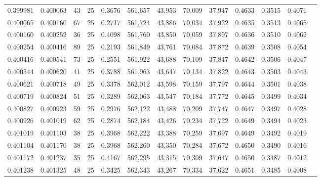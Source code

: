 \begin{tabular}{rrrrrrrrrrrrr}
0.399981 & 0.400063 &    43 &  25 &                                     0.3676 & 561,657 &  43,953 &  70,009 &  37,947 & 0.4633 & 0.3515 & 0.4071 \\
0.400065 & 0.400160 &    67 &  25 &                                     0.2717 & 561,724 &  43,886 &  70,034 &  37,922 & 0.4635 & 0.3513 & 0.4065 \\
0.400160 & 0.400252 &    36 &  25 &                                     0.4098 & 561,760 &  43,850 &  70,059 &  37,897 & 0.4636 & 0.3510 & 0.4062 \\
0.400254 & 0.400416 &    89 &  25 &                                     0.2193 & 561,849 &  43,761 &  70,084 &  37,872 & 0.4639 & 0.3508 & 0.4054 \\
0.400416 & 0.400541 &    73 &  25 &                                     0.2551 & 561,922 &  43,688 &  70,109 &  37,847 & 0.4642 & 0.3506 & 0.4047 \\
0.400544 & 0.400620 &    41 &  25 &                                     0.3788 & 561,963 &  43,647 &  70,134 &  37,822 & 0.4643 & 0.3503 & 0.4043 \\
0.400621 & 0.400718 &    49 &  25 &                                     0.3378 & 562,012 &  43,598 &  70,159 &  37,797 & 0.4644 & 0.3501 & 0.4038 \\
0.400719 & 0.400824 &    51 &  25 &                                     0.3289 & 562,063 &  43,547 &  70,184 &  37,772 & 0.4645 & 0.3499 & 0.4034 \\
0.400827 & 0.400923 &    59 &  25 &                                     0.2976 & 562,122 &  43,488 &  70,209 &  37,747 & 0.4647 & 0.3497 & 0.4028 \\
0.400926 & 0.401019 &    62 &  25 &                                     0.2874 & 562,184 &  43,426 &  70,234 &  37,722 & 0.4649 & 0.3494 & 0.4023 \\
0.401019 & 0.401103 &    38 &  25 &                                     0.3968 & 562,222 &  43,388 &  70,259 &  37,697 & 0.4649 & 0.3492 & 0.4019 \\
0.401104 & 0.401170 &    38 &  25 &                                     0.3968 & 562,260 &  43,350 &  70,284 &  37,672 & 0.4650 & 0.3490 & 0.4016 \\
0.401172 & 0.401237 &    35 &  25 &                                     0.4167 & 562,295 &  43,315 &  70,309 &  37,647 & 0.4650 & 0.3487 & 0.4012 \\
0.401238 & 0.401325 &    48 &  25 &                                     0.3425 & 562,343 &  43,267 &  70,334 &  37,622 & 0.4651 & 0.3485 & 0.4008 \\

\end{tabular}
